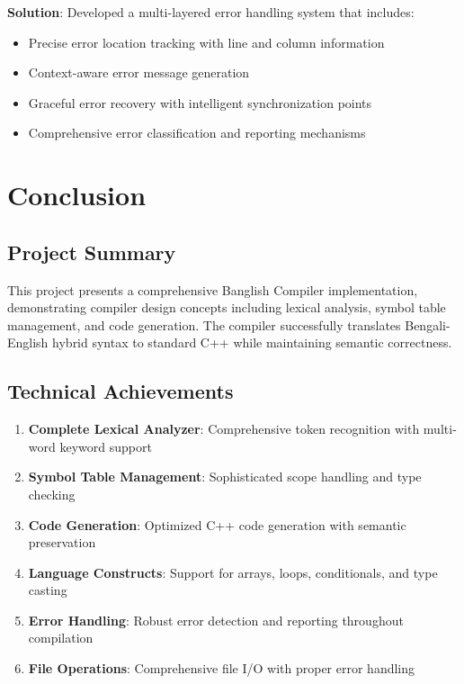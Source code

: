 \documentclass[12pt,a4paper]{article}
\begin{document}
\textbf{Solution}: Developed a multi-layered error handling system that includes:

\begin{itemize}[itemsep=2pt]
    \item Precise error location tracking with line and column information
    \item Context-aware error message generation
    \item Graceful error recovery with intelligent synchronization points
    \item Comprehensive error classification and reporting mechanisms
\end{itemize}

\section{Conclusion}

\subsection{Project Summary}

This project presents a comprehensive Banglish Compiler implementation, demonstrating compiler design concepts including lexical analysis, symbol table management, and code generation. The compiler successfully translates Bengali-English hybrid syntax to standard C++ while maintaining semantic correctness.

\subsection{Technical Achievements}

\begin{enumerate}[leftmargin=*,itemsep=3pt]
    \item \textbf{Complete Lexical Analyzer}: Comprehensive token recognition with multi-word keyword support
    \item \textbf{Symbol Table Management}: Sophisticated scope handling and type checking
    \item \textbf{Code Generation}: Optimized C++ code generation with semantic preservation
    \item \textbf{Language Constructs}: Support for arrays, loops, conditionals, and type casting
    \item \textbf{Error Handling}: Robust error detection and reporting throughout compilation
    \item \textbf{File Operations}: Comprehensive file I/O with proper error handling
\end{enumerate}
\end{document}
